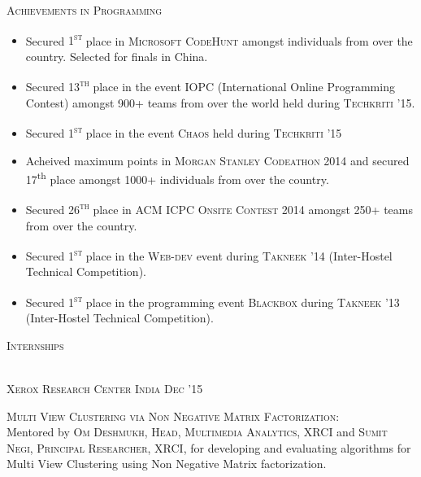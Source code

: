 \documentclass[10pt]{article}
\begin{document}
	{\centering\Large{\textsc{Achievements in Programming}} \hrulefill}

	\begin{itemize}
	\setlength\itemsep{-0.25em}
	\item Secured \textsc{1\textsuperscript{st}} place in \textsc{Microsoft CodeHunt} amongst individuals from over the country. Selected for finals in China.
	\item Secured \textsc{13\textsuperscript{th}} place in the event \textsc{IOPC} (International Online Programming Contest) amongst 900+ teams from over the world held during \textsc{Techkriti '15}.
	\item Secured \textsc{1\textsuperscript{st}} place in the event \textsc{Chaos} held during \textsc{Techkriti '15}
	\item
	Acheived maximum points in \textsc{Morgan Stanley Codeathon 2014} and secured 17\textsuperscript{th} place amongst 1000+ individuals from over the country.
	\item Secured \textsc{26\textsuperscript{th}} place in \textsc{ACM ICPC Onsite Contest} 2014 amongst \textsc{250+} teams from over the country.
	\item Secured \textsc{1\textsuperscript{st}} place in the \textsc{Web-dev} event during \textsc{Takneek '14} (Inter-Hostel Technical Competition).
	\item Secured \textsc{1\textsuperscript{st}} place in the programming event \textsc{Blackbox} during \textsc{Takneek '13} (Inter-Hostel Technical Competition).

	\end{itemize}
	
	{\centering\Large{\textsc{Internships}}	\hrulefill}
	
	\vspace{3mm}
	
	{}	\hfill{} \\
	\small\textsc{Xerox Research Center India}
	\hfill{\small{\textsc{Dec '15}}}
	
	\begin{changemargin}{1.0cm}{0.0cm} 
	{
	\large{\textsc{{Multi View Clustering via Non Negative Matrix Factorization:}}}  \\
	\small{Mentored by \textsc{Om Deshmukh, Head, Multimedia Analytics, XRCI} and \textsc{Sumit Negi, Principal Researcher, XRCI}, for developing and evaluating algorithms for Multi View Clustering using Non Negative Matrix factorization.} 		
	}
	\end{changemargin} 	
	
\end{document}
